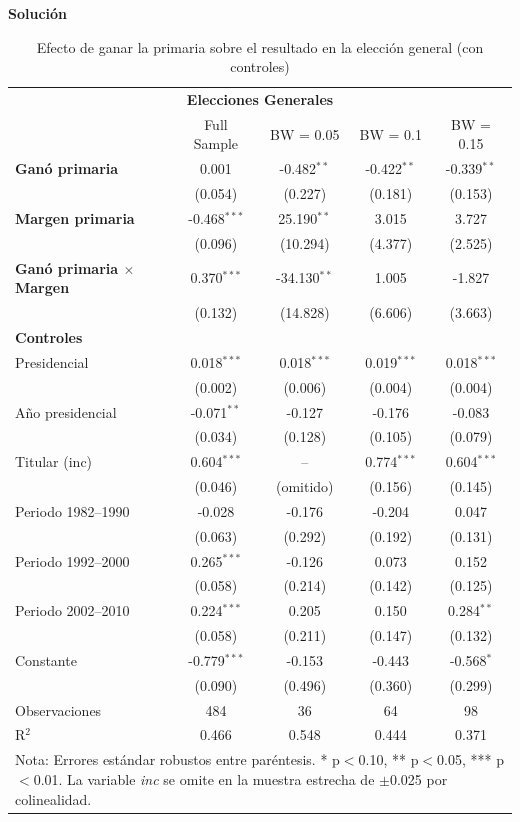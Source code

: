 \documentclass[a4paper, answers, addpoints, 11pt]{exam}
\newenvironment{solucion}{%
  \begin{mdframed}[
    backgroundcolor=blue!5,    %
    linecolor=blue!50,          %
    linewidth=2pt,              %
    leftmargin=10pt,            %
    rightmargin=8pt,           %
    topline=true,              %
    bottomline=true,            %
    roundcorner=10pt,           %
    innerleftmargin=10pt,       %
    innerrightmargin=10pt,      %
    innerbottommargin=10pt,     %
    innertopmargin=10pt         %
  ]%
  \begin{tcolorbox}[colframe=blue!50!black, colback=blue!50, coltitle=white, sharp corners=all, boxrule=1mm, width=\textwidth, halign=left, valign=center, top=0mm, bottom=0mm, left=0mm, right=0mm] \textbf{Solución} \end{tcolorbox} }{\end{mdframed}}
\begin{document}
\begin{enumerate}[resume]
\begin{enumerate}
\begin{solucion}
\begin{table}[H]\centering
\caption{Efecto de ganar la primaria sobre el resultado en la elección general (con controles)}
\label{tab:rd_controls_full}
\footnotesize
\begin{tabular}{lcccc}
\toprule
 \multicolumn{5}{c}{\textbf{Elecciones Generales}} \\
\cmidrule(lr){2-5}
& Full Sample & BW = 0.05 & BW = 0.1 & BW = 0.15 \\
\midrule
\textbf{Ganó primaria} & 0.001 & -0.482$^{**}$ & -0.422$^{**}$ & -0.339$^{**}$ \\
 & (0.054) & (0.227) & (0.181) & (0.153) \\
\textbf{Margen primaria} & -0.468$^{***}$ & 25.190$^{**}$ & 3.015 & 3.727 \\
 & (0.096) & (10.294) & (4.377) & (2.525) \\
\textbf{Ganó primaria $\times$ Margen} & 0.370$^{***}$ & -34.130$^{**}$ & 1.005 & -1.827 \\
 & (0.132) & (14.828) & (6.606) & (3.663) \\
\midrule
\textbf{Controles} \\
Presidencial & 0.018$^{***}$ & 0.018$^{***}$ & 0.019$^{***}$ & 0.018$^{***}$ \\
 & (0.002) & (0.006) & (0.004) & (0.004) \\
Año presidencial & -0.071$^{**}$ & -0.127 & -0.176 & -0.083 \\
 & (0.034) & (0.128) & (0.105) & (0.079) \\
Titular (inc) & 0.604$^{***}$ & -- & 0.774$^{***}$ & 0.604$^{***}$ \\
 & (0.046) & (omitido) & (0.156) & (0.145) \\
Periodo 1982--1990 & -0.028 & -0.176 & -0.204 & 0.047 \\
 & (0.063) & (0.292) & (0.192) & (0.131) \\
Periodo 1992--2000 & 0.265$^{***}$ & -0.126 & 0.073 & 0.152 \\
 & (0.058) & (0.214) & (0.142) & (0.125) \\
Periodo 2002--2010 & 0.224$^{***}$ & 0.205 & 0.150 & 0.284$^{**}$ \\
 & (0.058) & (0.211) & (0.147) & (0.132) \\
\midrule
Constante & -0.779$^{***}$ & -0.153 & -0.443 & -0.568$^{*}$ \\
 & (0.090) & (0.496) & (0.360) & (0.299) \\
\midrule
Observaciones & 484 & 36 & 64 & 98 \\
R$^2$ & 0.466 & 0.548 & 0.444 & 0.371 \\
\bottomrule
\multicolumn{5}{p{13cm}}{\footnotesize Nota: Errores estándar robustos entre paréntesis. * p$<$0.10, ** p$<$0.05, *** p$<$0.01. La variable \textit{inc} se omite en la muestra estrecha de $\pm$0.025 por colinealidad.}
\end{tabular}
\end{table}




\end{solucion}
\end{enumerate}
\end{enumerate}
\end{document}
